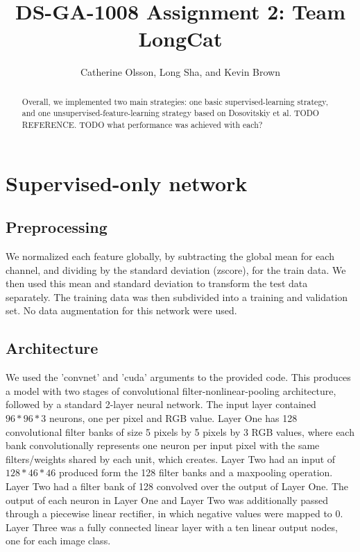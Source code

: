 \documentclass{article} %
\title{DS-GA-1008 Assignment 2: Team LongCat}
\author{
Catherine Olsson, Long Sha, and Kevin Brown \\
}
\begin{document}
\maketitle

\begin{abstract}
Overall, we implemented two main strategies: one basic supervised-learning strategy, and one unsupervised-feature-learning strategy based on Dosovitskiy et al. TODO REFERENCE. TODO what performance was achieved with each?
\end{abstract}

\section{Supervised-only network}

\subsection{Preprocessing}

We normalized each feature globally, by subtracting the global mean for each
channel, and dividing by the standard deviation (zscore), for the train data.
We then used this mean and standard deviation to transform the test data
separately. The training data was then subdivided into a training and validation
set. No data augmentation for this network were used. 

\subsection{Architecture}

We used the 'convnet' and 'cuda' arguments to the provided code. This produces
a model with two stages of convolutional filter-nonlinear-pooling architecture,
followed by a standard 2-layer neural network. The input layer contained
$96*96*3$ neurons, one per pixel and RGB value. Layer One has 128 convolutional
filter banks of size 5 pixels by 5 pixels by 3 RGB values, where each bank
convolutionally represents one neuron per input pixel with the same
filters/weights shared by each unit, which creates. Layer Two had an input of
$128*46*46$ produced form the 128 filter banks and a maxpooling operation.
Layer Two had a filter bank of 128 convolved over the output of Layer One.  The
output of each neuron in Layer One and Layer Two was additionally passed
through a piecewise linear rectifier, in which negative values were mapped to
0. Layer Three was a fully connected linear layer with a ten linear output
nodes, one for each image class. 
\end{document}

